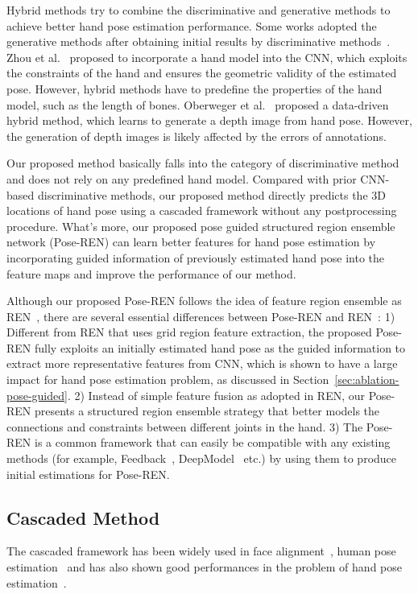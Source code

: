 \documentclass[final, 5p]{elsarticle}
\begin{document}
Hybrid methods try to combine the discriminative and generative methods to achieve better hand pose estimation performance. Some works adopted the generative methods after obtaining initial results by discriminative methods~\cite{krejov2015combining, sridhar2015fast, sharp2015accurate}. Zhou et al.~\cite{zhou2016model} proposed to incorporate a hand model into the CNN, which exploits the constraints of the hand and ensures the geometric validity of the estimated pose. However, hybrid methods have to predefine the properties of the hand model, such as the length of bones. Oberweger et al.~\cite{oberweger2015training} proposed a data-driven hybrid method, which learns to generate a depth image from hand pose. However, the generation of depth images is likely affected by the errors of annotations.

Our proposed method basically falls into the category of discriminative method and does not rely on any predefined hand model. Compared with prior CNN-based discriminative methods, our proposed method directly predicts the 3D locations of hand pose using a cascaded framework without any postprocessing procedure. What's more, our proposed pose guided structured region ensemble network (Pose-REN) can learn better features for hand pose estimation by incorporating guided information of previously estimated hand pose into the feature maps and improve the performance of our method.

Although our proposed Pose-REN follows the idea of feature region ensemble as REN~\cite{guo2017region}, there are several essential differences between Pose-REN and REN~\cite{guo2017region}: 1) Different from REN that uses grid region feature extraction, the proposed Pose-REN fully exploits an initially estimated hand pose as the guided information to extract more representative features from CNN, which is shown to have a large impact for hand pose estimation problem, as discussed in Section~\ref{sec:ablation-pose-guided}. 2) Instead of simple feature fusion as adopted in REN, our Pose-REN presents a structured region ensemble strategy that better models the connections and constraints between different joints in the hand. 3) The Pose-REN is a common framework that can easily be compatible with any existing methods (for example, Feedback~\cite{oberweger2015training}, DeepModel~\cite{zhou2016model} etc.) by using them to produce initial estimations for Pose-REN.

\subsection{Cascaded Method}
The cascaded framework has been widely used in face alignment~\cite{zhu2015face, chen2014joint, kowalski2017deep}, human pose estimation~\cite{toshev2014deeppose, carreira2016human} and has also shown good performances in the problem of hand pose estimation~\cite{sun2015cascaded, oberweger2015training, YeSpatialHandECCV2016}.
\end{document}
